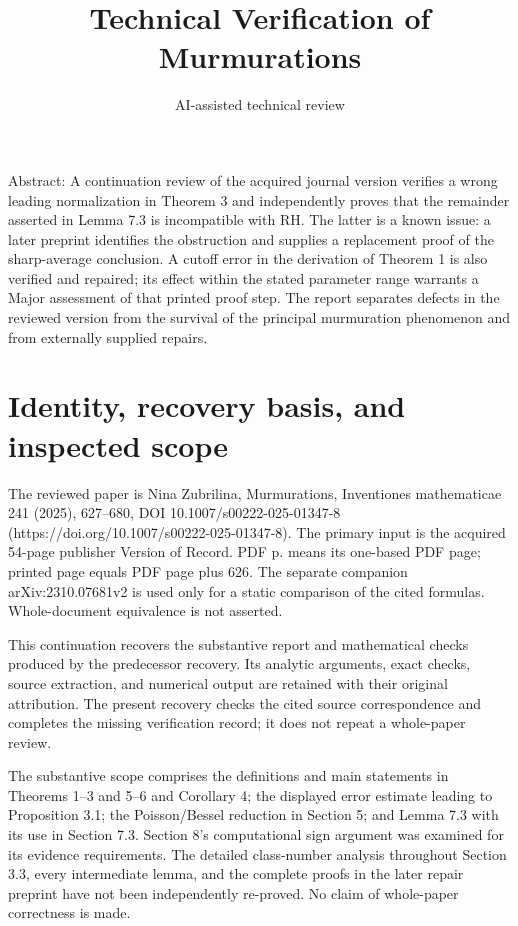 \documentclass[10pt]{article}
\title{Technical Verification of Murmurations}
\author{AI-assisted technical review}
\date{}
\begin{document}
\maketitle
Abstract: A continuation review of the acquired journal version verifies a wrong leading normalization in Theorem 3 and independently proves that the remainder asserted in Lemma 7.3 is incompatible with RH. The latter is a known issue: a later preprint identifies the obstruction and supplies a replacement proof of the sharp-average conclusion. A cutoff error in the derivation of Theorem 1 is also verified and repaired; its effect within the stated parameter range warrants a Major assessment of that printed proof step. The report separates defects in the reviewed version from the survival of the principal murmuration phenomenon and from externally supplied repairs.\par
\section*{Identity, recovery basis, and inspected scope}
The reviewed paper is Nina Zubrilina, Murmurations, Inventiones mathematicae 241 (2025), 627–680, DOI 10.1007/s00222-025-01347-8 (https://doi.org/10.1007/s00222-025-01347-8). The primary input is the acquired 54-page publisher Version of Record. PDF p. means its one-based PDF page; printed page equals PDF page plus 626. The separate companion arXiv:2310.07681v2 is used only for a static comparison of the cited formulas. Whole-document equivalence is not asserted.\par
This continuation recovers the substantive report and mathematical checks produced by the predecessor recovery. Its analytic arguments, exact checks, source extraction, and numerical output are retained with their original attribution. The present recovery checks the cited source correspondence and completes the missing verification record; it does not repeat a whole-paper review.\par
The substantive scope comprises the definitions and main statements in Theorems 1–3 and 5–6 and Corollary 4; the displayed error estimate leading to Proposition 3.1; the Poisson/Bessel reduction in Section 5; and Lemma 7.3 with its use in Section 7.3. Section 8’s computational sign argument was examined for its evidence requirements. The detailed class-number analysis throughout Section 3.3, every intermediate lemma, and the complete proofs in the later repair preprint have not been independently re-proved. No claim of whole-paper correctness is made.\par
\end{document}
